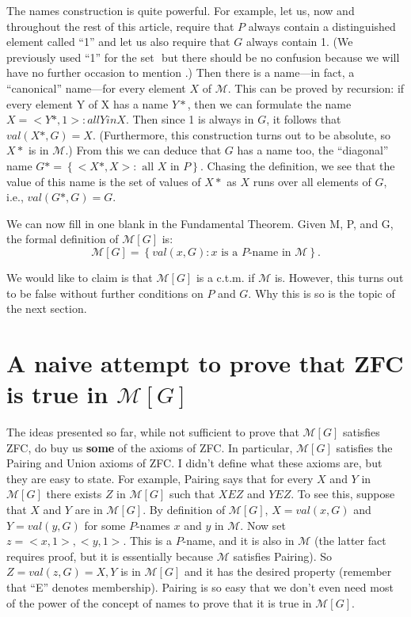 \documentclass[10pt]{article}
\begin{document}
The names construction is quite powerful. For example, let us, now and throughout the rest of this article, require that $P$ always contain a distinguished element called ``1'' and let us also require that $G$ always contain 1. (We previously used ``1'' for the set ${{}}$ but there should be no confusion because we will have no further occasion to mention ${{}}$.) Then there is a name---in fact, a ``canonical'' name---for every element $X$ of $\mathcal M$. This can be proved by recursion: if every element Y of X has a name $Y*$, then we can formulate the name $X = {<Y*,1> : all Y in X}$. Then since 1 is always in $G$, it follows that $val(X*,G) = X$. (Furthermore, this construction turns out to be absolute, so $X*$ is in $\mathcal M$.) From this we can deduce that $G$ has a name too, the ``diagonal'' name $G* = \left\{<X*,X> :\text{ all }X\text{ in }P\right\}$. Chasing the definition, we see that the value of this name is the set of values of $X*$ as $X$ runs over all elements of $G$, i.e., $val(G*,G) = G$.

We can now fill in one blank in the Fundamental Theorem. Given M, P, and G, the formal definition of $\mathcal{M}[G]$ is: 
 $$\mathcal{M}[G] = \left\{val(x,G) : x\text{ is a }P\text{-name in }\mathcal M\right\}.$$

We would like to claim is that $\mathcal{M}[G]$ is a c.t.m. if $\mathcal{M}$ is. However, this turns out to be false without further conditions on $P$ and $G$. Why this is so is the topic of the next section.


\section{A naive attempt to prove that ZFC is true in $\mathcal{M}[G]$}

The ideas presented so far, while not sufficient to prove that $\mathcal{M}[G]$ satisfies ZFC, do buy us \textbf{some} of the axioms of ZFC. In particular, $\mathcal{M}[G]$ satisfies the Pairing and Union axioms of ZFC. I didn't define what these axioms are, but they are easy to state. For example, Pairing says that for every $X$ and $Y$ in $\mathcal{M}[G]$ there exists $Z$ in $\mathcal{M}[G]$ such that $X E Z$ and $Y E Z$. To see this, suppose that $X$ and $Y$ are in $\mathcal{M}[G]$. By definition of $\mathcal{M}[G]$, $X = val(x,G)$ and $Y = val(y,G)$ for some $P$-names $x$ and $y$ in $\mathcal M$. Now set $z = {<x,1>, <y,1>}$. This is a $P$-name, and it is also in $\mathcal{M}$ (the latter fact requires proof, but it is essentially because $\mathcal{M}$ satisfies Pairing). So $Z = val(z,G) = {X,Y}$ is in $\mathcal{M}[G]$ and it has the desired property (remember that ``E'' denotes membership). Pairing is so easy that we don't even need most of the power of the concept of names to prove that it is true in $\mathcal{M}[G]$.
\end{document}
